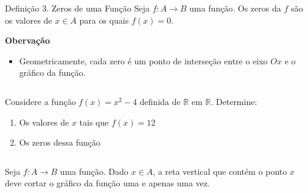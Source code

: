 \begin{frame}
  \begin{block}{Definição 3. Zeros de uma Função}
    Seja $f:A\rightarrow B$ uma função. Os zeros da $f$ são os valores de $x\in A$ para os quais $f(x) = 0$.

    \textbf{Obervação}
    \begin{itemize}
      \item Geometricamente, cada zero é um ponto de interseção entre o eixo $Ox$ e o gráfico da função.
    \end{itemize}
  \end{block}
  \begin{columns}[onlytextwidth]
    \begin{column}{0.48\textwidth}
      \begin{example-highlight}
        Considere a função $f(x) = x^2 - 4$ definida de $\mathbb{R}$ em $\mathbb{R}$. Determine:
      \end{example-highlight}
      \begin{enumerate}
        \item Os valores de $x$ tais que $f(x) = 12$
        \item Os zeros dessa função
      \end{enumerate}
    \end{column}
    \begin{column}{0.48\textwidth}
    \end{column}
  \end{columns}
\end{frame}

\begin{frame}
  \begin{theorem}
    Seja $f:A\rightarrow B$ uma função. Dado $x\in A$, a reta vertical que contém o ponto $x$ deve cortar o gráfico da função uma e apenas uma vez.
  \end{theorem}
  \begin{figure}
    \hspace*{0.75cm}
  \end{figure}
\end{frame}

